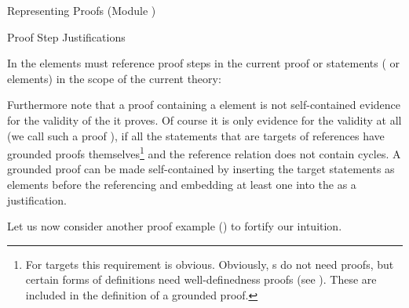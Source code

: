 \begin{omgroup}[id=proofs,short=Representing Proofs]{Representing Proofs (Module {})}
\begin{module}[id=justifications]
\begin{omgroup}[id=proofs.justifications]{Proof Step Justifications}
\begin{omtext}
  In \omdoc the  elements must reference proof steps in the current
  proof or statements ( or  elements) in the scope
  of the current theory: 
\end{omtext}

Furthermore note that a proof containing a  element is not
self-contained evidence for the validity of the  it proves.
Of course it is only evidence for the validity at all (we call such a proof
{}), if all the statements that are targets of
 references have grounded proofs themselves\footnote{For
   targets this requirement is obvious. Obviously,
  {s} do not need proofs, but certain forms of definitions need
  well-definedness proofs (see {}). These are included in
  the definition of a grounded proof.} and the reference relation does not contain
cycles. A grounded proof can be made self-contained by inserting the target
statements as  elements before the referencing
 and embedding at least one  into the
 as a justification.

Let us now consider another proof example ({}) to fortify our intuition.


\end{omgroup}
\end{module}
\end{omgroup}
